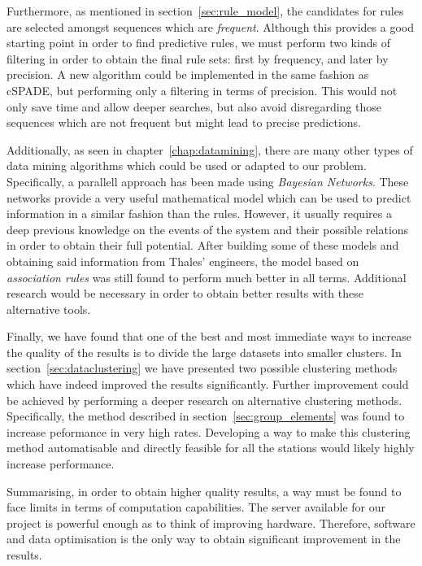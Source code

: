 Furthermore, as mentioned in section~\ref{sec:rule_model}, the candidates for rules are selected amongst sequences which are \emph{frequent}. Although this provides a good starting point in order to find predictive rules, we must perform two kinds of filtering in order to obtain the final rule sets: first by frequency, and later by precision. A new algorithm could be implemented in the same fashion as cSPADE, but performing only a filtering in terms of precision. This would not only save time and allow deeper searches, but also avoid disregarding those sequences which are not frequent but might lead to precise predictions.

Additionally, as seen in chapter~\ref{chap:datamining}, there are many other types of data mining algorithms which could be used or adapted to our problem. Specifically, a parallell approach has been made using \emph{Bayesian Networks}. These networks provide a very useful mathematical model which can be used to predict information in a similar fashion than the rules. However, it usually requires a deep previous knowledge on the events of the system and their possible relations in order to obtain their full potential. After building some of these models and obtaining said information from Thales' engineers, the model based on \emph{association rules} was still found to perform much better in all terms. Additional research would be necessary in order to obtain better results with these alternative tools.

Finally, we have found that one of the best and most immediate ways to increase the quality of the results is to divide the large datasets into smaller clusters. In section~\ref{sec:dataclustering} we have presented two possible clustering methods which have indeed improved the results significantly. Further improvement could be achieved by performing a deeper research on alternative clustering methods. Specifically, the method described in section~\ref{sec:group_elements} was found to increase peformance in very high rates. Developing a way to make this clustering method automatisable and directly feasible for all the stations would likely highly increase performance.

Summarising, in order to obtain higher quality results, a way must be found to face limits in terms of computation capabilities. The server available for our project is powerful enough as to think of improving hardware. Therefore, software and data optimisation is the only way to obtain significant improvement in the results.